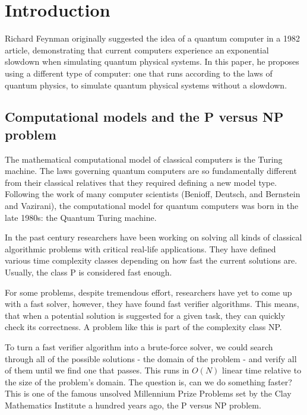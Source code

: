 \chapter{Introduction}

Richard Feynman originally suggested the idea of a quantum computer in a 1982 article\cite{feynman_simulating_1982}, demonstrating that current computers experience an exponential slowdown when simulating quantum physical systems. In this paper, he proposes using a different type of computer: one that runs according to the laws of quantum physics, to simulate quantum physical systems without a slowdown.\cite{Hirvensalo}

\section{Computational models and the P versus NP problem}

The mathematical computational model of classical computers is the Turing machine. The laws governing quantum computers are so fundamentally different from their classical relatives that they required defining a new model type. Following the work of many computer scientists (Benioff\cite{benioff_models_1998}, Deutsch\cite{deutsch_quantum_1985}, and Bernstein and Vazirani\cite{bernstein_quantum_1993}), the computational model for quantum computers was born in the late 1980s: the Quantum Turing machine.

In the past century researchers have been working on solving all kinds of classical algorithmic problems with critical real-life applications. They have defined various time complexity classes depending on how fast the current solutions are. Usually, the class P is considered fast enough.

For some problems, despite tremendous effort, researchers have yet to come up with a fast solver, however, they have found fast verifier algorithms. This means, that when a potential solution is suggested for a given task, they can quickly check its correctness. A problem like this is part of the complexity class NP.

To turn a fast verifier algorithm into a brute-force solver, we could search through all of the possible solutions - the domain of the problem - and verify all of them until we find one that passes. This runs in $O(N)$ linear time relative to the size of the problem's domain. The question is, can we do something faster? This is one of the famous unsolved Millennium Prize Problems set by the Clay Mathematics Institute a hundred years ago, the P versus NP problem.

